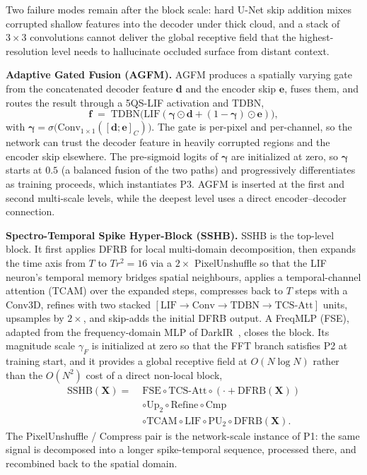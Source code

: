 \documentclass[conference]{IEEEtran}
\newcommand{\DFRB}{\textsc{DFRB}}
\newcommand{\AGFM}{\textsc{AGFM}}
\newcommand{\SSHB}{\textsc{SSHB}}
\begin{document}
Two failure modes remain after the block scale: hard U-Net skip
addition mixes corrupted shallow features into the decoder under
thick cloud, and a stack of $3\!\times\!3$ convolutions cannot
deliver the global receptive field that the highest-resolution
level needs to hallucinate occluded surface from distant context.

\textbf{Adaptive Gated Fusion (\AGFM{}).} \AGFM{} produces a
spatially varying gate from the concatenated decoder feature
$\mathbf{d}$ and the encoder skip $\mathbf{e}$, fuses them, and
routes the result through a 5QS-LIF activation and TDBN,
\begin{equation}
\mathbf{f}
\;=\;
\mathrm{TDBN}\bigl(\mathrm{LIF}(\boldsymbol{\gamma}\odot\mathbf{d}+(1-\boldsymbol{\gamma})\odot\mathbf{e})\bigr),
\label{eq:agfm}
\end{equation}
with $\boldsymbol{\gamma}\!=\!\sigma\bigl(\mathrm{Conv}_{1\times 1}([\mathbf{d};\mathbf{e}]_C)\bigr)$.
The gate is per-pixel and per-channel, so the network can trust the
decoder feature in heavily corrupted regions and the encoder skip
elsewhere. The pre-sigmoid logits of $\boldsymbol{\gamma}$ are
initialized at zero, so $\boldsymbol{\gamma}$ starts at $0.5$ (a
balanced fusion of the two paths) and progressively differentiates
as training proceeds, which instantiates P3. \AGFM{} is inserted at
the first and second multi-scale levels, while the deepest level
uses a direct encoder--decoder connection.

\textbf{Spectro-Temporal Spike Hyper-Block (\SSHB{}).} \SSHB{} is
the top-level block. It first applies \DFRB{} for local
multi-domain decomposition, then expands the time axis from $T$ to
$Tr^2\!=\!16$ via a $2\!\times$ PixelUnshuffle so that the LIF
neuron's temporal memory bridges spatial neighbours, applies a
temporal-channel attention (TCAM) over the expanded steps,
compresses back to $T$ steps with a Conv3D, refines with two
stacked $[\mathrm{LIF}\!\to\!\mathrm{Conv}\!\to\!\mathrm{TDBN}\!\to\!\mathrm{TCS\text{-}Att}]$
units, upsamples by $2\!\times$, and skip-adds the initial \DFRB{}
output. A FreqMLP (FSE), adapted from the frequency-domain MLP of
DarkIR~\cite{ref:darkir2024}, closes the block. Its magnitude
scale $\gamma_F$ is initialized at zero so that the FFT branch
satisfies P2 at training start, and it provides a global receptive
field at $O(N\log N)$ rather than the $O(N^2)$ cost of a direct
non-local block,
\begin{equation}
\begin{aligned}
\mathrm{SSHB}(\mathbf{X})
=\;&\mathrm{FSE}\circ\mathrm{TCS\text{-}Att}\circ
(\cdot{+}\mathrm{DFRB}(\mathbf{X}))\\
&\circ\mathrm{Up}_{2}\circ\mathrm{Refine}\circ\mathrm{Cmp}\\
&\circ\mathrm{TCAM}\circ\mathrm{LIF}\circ\mathrm{PU}_{2}\circ\mathrm{DFRB}(\mathbf{X}).
\end{aligned}
\label{eq:sshb}
\end{equation}
The PixelUnshuffle / Compress pair is the network-scale instance
of P1: the same signal is decomposed into a longer
spike-temporal sequence, processed there, and recombined back to
the spatial domain.
\end{document}
